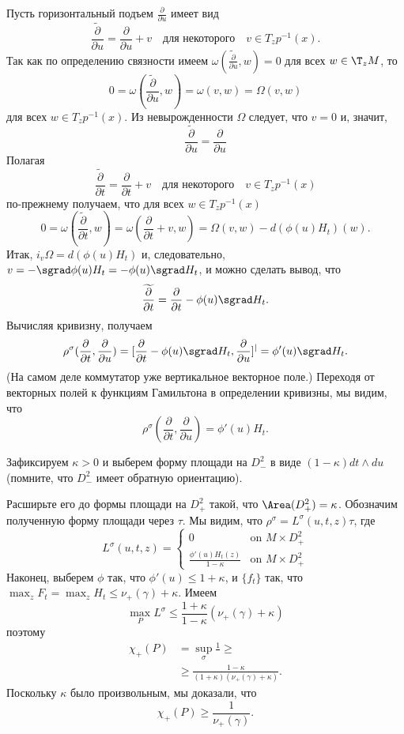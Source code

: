 Пусть горизонтальный подъем $\tfrac{\partial}{\partial u}$ имеет вид 
\[\widetilde{\frac{\partial}{\partial u}}  =\frac{\partial}{\partial u} + v
\quad\text{для некоторого}\quad
v \in T_z p^{-1} (x).\]
Так как по определению связности имеем $\omega(\widetilde{\frac{\partial}{\partial u}},w)=0$ для всех $w\in \T_zM$, то 
\[0=\omega(\widetilde{\frac{\partial}{\partial u}}, w) = \omega(v, w) = \Omega(v, w)\]
для всех $w \in T_z p^{-1} (x)$.
Из невырожденности $\Omega$ следует, что $v = 0$ и, значит, 
\[\widetilde{\frac{\partial}{\partial u}}=\frac{\partial}{\partial u}\]
Полагая
\[\widetilde{\frac{\partial}{\partial t}}=\frac{\partial}{\partial t}+v
\quad\text{для некоторого}\quad
v \in T_z p^{-1} (x)\]
по-прежнему получаем, что для всех $w \in T_z p^{-1} (x)$
\[0=\omega(\widetilde{\frac{\partial}{\partial t}}, w) = \omega(\frac{\partial}{\partial t}+v, w) = \Omega(v, w)- d(\phi(u)H_t)(w).
\]
Итак, 
$i_v \Omega = d(\phi(u)H_t)$ и, следовательно, 
$v = - \sgrad \phi(u)H_t = -\phi(u) \sgrad H_t$,
и можно сделать вывод, что 
\[\widetilde{\frac{\partial}{\partial t}}=\frac{\partial}{\partial t}-\phi(u) \sgrad H_t.\]
Вычисляя кривизну, получаем 
\[\rho^\sigma(\frac{\partial}{\partial t},\frac{\partial}{\partial u})
=
[\frac{\partial}{\partial t}-\phi(u)\sgrad H_t,\frac{\partial}{\partial u}]^\vert
=
\phi'(u)\sgrad H_t.\]
(На самом деле коммутатор уже вертикальное векторное поле.)
Переходя от векторных полей к функциям Гамильтона в определении кривизны, мы видим, что
\[\rho^\sigma(\frac{\partial}{\partial t},\frac{\partial}{\partial u})
=\phi'(u) H_t.
\]

Зафиксируем $\kappa > 0$ и выберем форму площади на $D_-^2$ в виде $(1 - \kappa)dt \wedge du$ (помните, что $D_-^2$ имеет обратную ориентацию).

Расширьте его до формы площади на $D_+^2$ такой, что $\Area (D_+^2) = \kappa$.
Обозначим полученную форму площади через $\tau$.
Мы видим, что $\rho^\sigma = L^\sigma (u, t, z)\tau$, где 
\[
L^\sigma(u,t,z)=
\begin{cases}
0&\text{on\ } M\times D^2_+
\\
\frac{\phi'(u)H_t(z)}{1-\kappa}&\text{on\ } M\times D^2_+
\end{cases}
\]
Наконец, выберем $\phi$ так, что $\phi' (u) \le 1 + \kappa$, и $\{f_t\}$ так, что $\max_z F_t = \max_z H_t \le \nu_+ (\gamma) + \kappa$.
Имеем 
\[\max_P L^\sigma \le  \frac{1+\kappa}{1-\kappa} (\nu_+ (\gamma) + \kappa)\]
поэтому 
\begin{align*}
\chi_+ (P) &= \sup_\sigma \frac1{}\ge
\\
&\ge\frac{1-\kappa}{(1 + \kappa)(\nu_+ (\gamma) + \kappa)}. 
\end{align*}
Поскольку $\kappa$ было произвольным, мы доказали, что 
\[\chi_+ (P) \ge \frac{1}{\nu_+ (\gamma)}.
\]
\qeds
